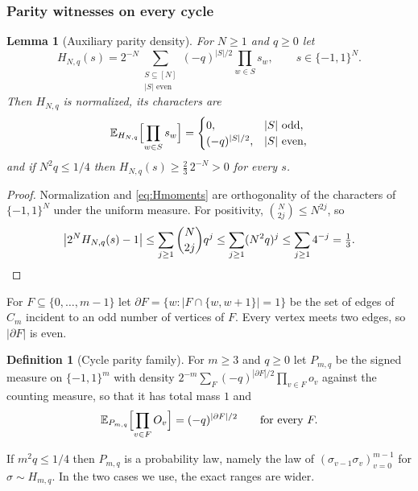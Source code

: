 \documentclass[11pt]{article}
\theoremstyle{plain}
\newtheorem{lemma}[theorem]{Lemma}
\theoremstyle{definition}
\newtheorem{definition}[theorem]{Definition}
\newcommand{\E}{\mathbb E}
\begin{document}
\subsubsection{Parity witnesses on every cycle}\label{sec:cycleparity}

\begin{lemma}[Auxiliary parity density]\label{lem:parityaux}
For $N\ge1$ and $q\ge0$ let
\begin{equation}\label{eq:Hdensity}
H_{N,q}(s)=2^{-N}\sum_{\substack{S\subseteq[N]\\|S|\text{ even}}}(-q)^{|S|/2}\prod_{w\in S}s_w,
\qquad s\in\{-1,1\}^N .
\end{equation}
Then $H_{N,q}$ is normalized, its characters are
\begin{equation}\label{eq:Hmoments}
\E_{H_{N,q}}\Bigl[\prod_{w\in S}s_w\Bigr]=
\begin{cases}
0,&|S|\text{ odd},\\
(-q)^{|S|/2},&|S|\text{ even},
\end{cases}
\end{equation}
and if $N^2q\le1/4$ then $H_{N,q}(s)\ge\tfrac23\,2^{-N}>0$ for every $s$.
\end{lemma}

\begin{proof}
Normalization and \eqref{eq:Hmoments} are orthogonality of the characters of $\{-1,1\}^N$ under the uniform measure. For positivity, $\binom N{2j}\le N^{2j}$, so
\[
\bigl|2^NH_{N,q}(s)-1\bigr|\le\sum_{j\ge1}\binom N{2j}q^j\le\sum_{j\ge1}(N^2q)^j\le\sum_{j\ge1}4^{-j}=\tfrac13 . \qedhere
\]
\end{proof}

For $F\subseteq\{0,\dots,m-1\}$ let $\partial F=\{w:|F\cap\{w,w+1\}|=1\}$ be the set of edges of $C_m$ incident to an odd number of vertices of $F$. Every vertex meets two edges, so $|\partial F|$ is even.

\begin{definition}[Cycle parity family]\label{def:cycletarget}
For $m\ge3$ and $q\ge0$ let $P_{m,q}$ be the signed measure on $\{-1,1\}^m$ with density $2^{-m}\sum_F(-q)^{|\partial F|/2}\prod_{v\in F}o_v$ against the counting measure, so that it has total mass $1$ and
\begin{equation}\label{eq:cycletarget}
\E_{P_{m,q}}\Bigl[\prod_{v\in F}O_v\Bigr]=(-q)^{|\partial F|/2}\qquad\text{for every }F .
\end{equation}
\end{definition}

If $m^2q\le1/4$ then $P_{m,q}$ is a probability law, namely the law of $(\sigma_{v-1}\sigma_v)_{v=0}^{m-1}$ for $\sigma\sim H_{m,q}$. In the two cases we use, the exact ranges are wider.
\end{document}

